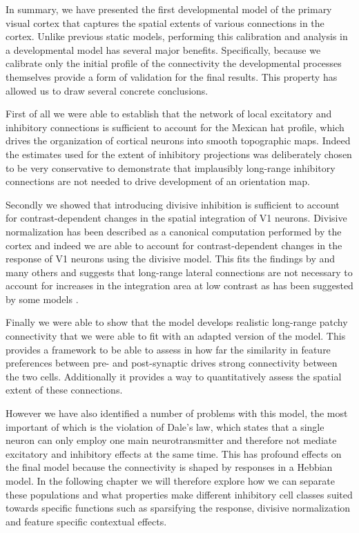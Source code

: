 In summary, we have presented the first developmental model of
the primary visual cortex that captures the spatial extents of various
connections in the cortex. Unlike previous static models, performing
this calibration and analysis in a developmental model has several major
benefits. Specifically, because we calibrate only the initial profile
of the connectivity the developmental processes themselves provide a
form of validation for the final results. This property has allowed us
to draw several concrete conclusions.

First of all we were able to establish that the network of local
excitatory and inhibitory connections is sufficient to account for the
Mexican hat profile, which drives the organization of cortical neurons
into smooth topographic maps. Indeed the estimates used for the extent
of inhibitory projections was deliberately chosen to be very
conservative to demonstrate that implausibly long-range inhibitory
connections are not needed to drive development of an orientation map.

Secondly we showed that introducing divisive inhibition is sufficient
to account for contrast-dependent changes in the spatial integration
of V1 neurons. Divisive normalization has been described as a
canonical computation performed by the cortex and indeed we are able
to account for contrast-dependent changes in the response of V1
neurons using the divisive model. This fits the findings by
\cite{Carandini2012} and many others and suggests that long-range
lateral connections are not necessary to account for increases in the
integration area at low contrast as has been suggested by some models
\citep{Levitt2002, Schwabe2006}.

Finally we were able to show that the model develops realistic
long-range patchy connectivity that we were able to fit with an
adapted version of the \cite{Buzas2006} model. This provides a
framework to be able to assess in how far the similarity in feature
preferences between pre- and post-synaptic drives strong connectivity
between the two cells. Additionally it provides a way to
quantitatively assess the spatial extent of these connections.

However we have also identified a number of problems with this model,
the most important of which is the violation of Dale's law, which
states that a single neuron can only employ one main neurotransmitter
and therefore not mediate excitatory and inhibitory effects at the
same time. This has profound effects on the final model because the
connectivity is shaped by responses in a Hebbian model. In the
following chapter we will therefore explore how we can separate these
populations and what properties make different inhibitory cell classes
suited towards specific functions such as sparsifying the response,
divisive normalization and feature specific contextual effects.
